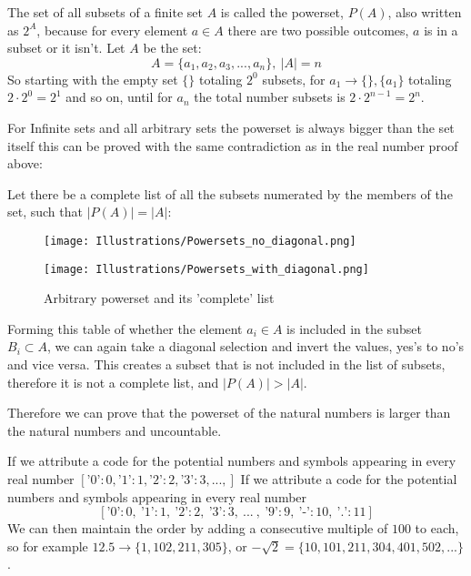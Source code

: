 The set of all subsets of a finite set $A$ is called the powerset, $P(A)$, also written as $2^{A}$, because for every element $a \in A$ there are two possible outcomes, $a$ is in a subset or it isn't. Let $A$ be the set: $$A = \{ a_{1}, a_{2}, a_{3},..., a_{n}\},\ \lvert{A}\rvert = n$$
So starting with the empty set $\{ \}$ totaling $2^{0}$ subsets, for $a_{1} \rightarrow \{\}, \{a_{1}\}$ totaling $2\cdot2^{0} = 2^{1}$ and so on, until for $a_{n}$ the total number subsets is $2\cdot2^{n-1} =2^{n}$.
\bigskip

For Infinite sets and all arbitrary sets the powerset is always bigger than the set itself this can be proved with the same contradiction as in the real number proof above:
\bigskip

Let there be a complete list of all the subsets numerated by the members of the set, such that $\lvert{P(A)}\rvert = \lvert{A}\rvert$:

\begin{figure}[H]
    \centering
    \begin{minipage}{0.45\textwidth}
        \centering
        \texttt{[image: Illustrations/Powersets\_no\_diagonal.png]}
        \label{fig:power_set1}
    \end{minipage}
    \hfill
    \begin{minipage}{0.45\textwidth}
        \centering
        \texttt{[image: Illustrations/Powersets\_with\_diagonal.png]}
        \label{fig:power_set2}
    \end{minipage}
    \caption{Arbitrary powerset and its 'complete' list}
\end{figure}

Forming this table of whether the element $a_{i} \in A$ is included in the subset $B_{i} \subset A$, we can again take a diagonal selection and invert the values, yes's to no's and vice versa. This creates a subset that is not included in the list of subsets, therefore it is not a complete list, and $\lvert{P(A)}\rvert > \lvert{A}\rvert$.
\bigskip

Therefore we can prove that the powerset of the natural  numbers is larger than the natural  numbers and uncountable.
\bigskip

If we attribute a code for the potential numbers and symbols appearing in every real number $[\text{'0'}:0,\text{'1'}:1,\text{'2'}:2,\text{'3'}:3,...,  ]$
If we attribute a code for the potential numbers and symbols appearing in every real number $$[\text{'0'}:0,\ \text{'1'}:1,\ \text{'2'}:2,\ \text{'3'}:3,\ ...\ ,\   \text{'9'}:9,\  \text{'-'}:10,\  \text{'.'}:11]$$ We can then maintain the order by adding a consecutive multiple of $100$ to each, so for example $12.5 \rightarrow \{1, 102,  211, 305\}$, or $-\sqrt{2} = \{10, 101, 211, 304,401, 502, ... \}$.
\bigskip

